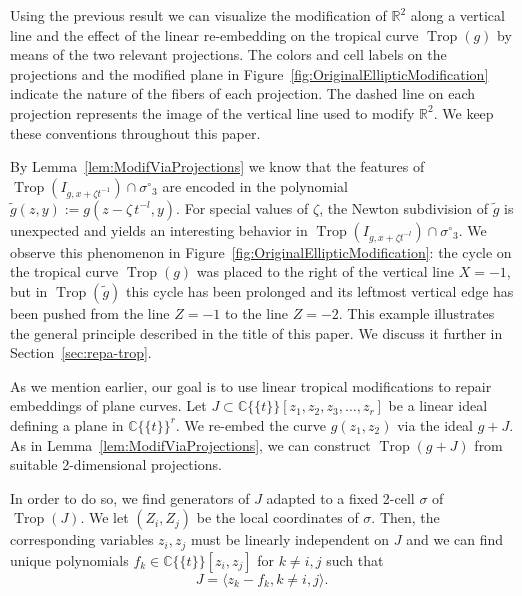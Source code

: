 \documentclass[11pt]{amsart}
\numberwithin{equation}{section}
\theoremstyle{plain}
\theoremstyle{definition}
\theoremstyle{remark}
\begin{document}
Using the previous result we can visualize the modification of ${\mathbb{R}}^2$
along a vertical line and the effect of the linear re-embedding on the
tropical curve $\operatorname{Trop}(g)$ by means of the two relevant projections.
The colors and cell labels on the projections and the modified plane
in Figure~\ref{fig:OriginalEllipticModification} indicate the nature
of the fibers of each projection. The dashed line on each projection
represents the image of the vertical line used to modify ${\mathbb{R}}^2$.  We
keep these conventions throughout this paper.

By Lemma~\ref{lem:ModifViaProjections} we know that the features of
$\operatorname{Trop}(I_{g,x+{\zeta} t^{-1}})\cap {\sigma^{\circ}}_3$ are encoded in the
polynomial $\tilde{g}(z,y):=g(z-{\zeta} \,t^{-l}, y)$.  For special values
of ${\zeta}$, the Newton subdivision of $\tilde{g}$ is unexpected and
yields an interesting behavior in $\operatorname{Trop}(I_{g,x+{\zeta} t^{-l}})\cap
{\sigma^{\circ}}_3$. We observe this phenomenon in
Figure~\ref{fig:OriginalEllipticModification}: the cycle on the
tropical curve $\operatorname{Trop}(g)$ was placed to the right of the vertical line
$X=-1$, but in $\operatorname{Trop}(\tilde{g})$ this cycle has been prolonged and
its leftmost vertical edge has been pushed from the line $Z=-1$ to the
line $Z=-2$. This example illustrates the general principle described
in the title of this paper. We discuss it further in
Section~\ref{sec:repa-trop}.

As we mention earlier, our goal is to use linear tropical
modifications to repair embeddings of plane curves. Let $J\subset
{{\mathbb{C}}\{\!\{t
\}\!\}}[z_1,z_2,z_3,\ldots, z_r]$  be a linear ideal defining a plane in ${{\mathbb{C}}\{\!\{t
\}\!\}}^{r}$. We re-embed the curve $g(z_1,z_2)$ via the ideal $ g + J$. As in Lemma~\ref{lem:ModifViaProjections}, we can construct $\operatorname{Trop}(g+J)$ from suitable 2-dimensional projections. 

In order to do so, we find generators of $J$ adapted to a fixed 2-cell
$\sigma$ of $\operatorname{Trop}(J)$. We let $(Z_i,Z_j)$ be the local coordinates of
$\sigma$. Then, the corresponding variables $z_i,z_j$ must be linearly
independent on $J$ and we can find unique polynomials $f_k\in
{{\mathbb{C}}\{\!\{t
\}\!\}}[z_i,z_j]$ for $k\neq i,j$ such that
\begin{equation}
J=\langle  z_k-f_k, k\neq i,j\rangle.
\label{eq:coordsJ}
 \end{equation}
\end{document}
